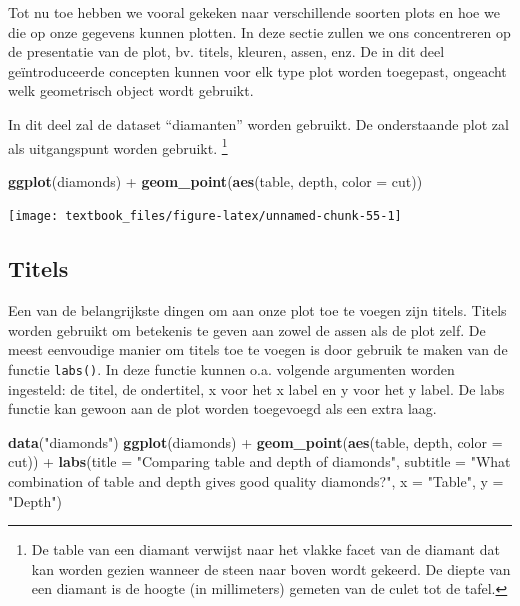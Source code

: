 \documentclass[]{tufte-book}
\newenvironment{Shaded}{}{}
\newcommand{\DataTypeTok}[1]{\textcolor[rgb]{0.56,0.13,0.00}{#1}}
\newcommand{\KeywordTok}[1]{\textcolor[rgb]{0.00,0.44,0.13}{\textbf{#1}}}
\newcommand{\NormalTok}[1]{#1}
\newcommand{\OperatorTok}[1]{\textcolor[rgb]{0.40,0.40,0.40}{#1}}
\newcommand{\StringTok}[1]{\textcolor[rgb]{0.25,0.44,0.63}{#1}}
\begin{document}
Tot nu toe hebben we vooral gekeken naar verschillende soorten plots en hoe we die op onze gegevens kunnen plotten. In deze sectie zullen we ons concentreren op de presentatie van de plot, bv. titels, kleuren, assen, enz. De in dit deel geïntroduceerde concepten kunnen voor elk type plot worden toegepast, ongeacht welk geometrisch object wordt gebruikt.

In dit deel zal de dataset ``diamanten'' worden gebruikt. De onderstaande plot zal als uitgangspunt worden gebruikt. \footnote{De table van een diamant verwijst naar het vlakke facet van de diamant dat kan worden gezien wanneer de steen naar boven wordt gekeerd. De diepte van een diamant is de hoogte (in millimeters) gemeten van de culet tot de tafel.}

\begin{Shaded}
\begin{Highlighting}[]
\KeywordTok{ggplot}\NormalTok{(diamonds) }\OperatorTok{+}
\StringTok{    }\KeywordTok{geom_point}\NormalTok{(}\KeywordTok{aes}\NormalTok{(table, depth, }\DataTypeTok{color =}\NormalTok{ cut))}
\end{Highlighting}
\end{Shaded}

\texttt{[image: textbook\_files/figure-latex/unnamed-chunk-55-1]}

\hypertarget{titels}{%
\subsection{Titels}\label{titels}}

Een van de belangrijkste dingen om aan onze plot toe te voegen zijn titels. Titels worden gebruikt om betekenis te geven aan zowel de assen als de plot zelf. De meest eenvoudige manier om titels toe te voegen is door gebruik te maken van de functie \texttt{labs()}. In deze functie kunnen o.a. volgende argumenten worden ingesteld: de titel, de ondertitel, x voor het x label en y voor het y label. De labs functie kan gewoon aan de plot worden toegevoegd als een extra laag.

\begin{Shaded}
\begin{Highlighting}[]
\KeywordTok{data}\NormalTok{(}\StringTok{"diamonds"}\NormalTok{)}
\KeywordTok{ggplot}\NormalTok{(diamonds) }\OperatorTok{+}
\StringTok{    }\KeywordTok{geom_point}\NormalTok{(}\KeywordTok{aes}\NormalTok{(table, depth, }\DataTypeTok{color =}\NormalTok{ cut)) }\OperatorTok{+}\StringTok{ }
\StringTok{    }\KeywordTok{labs}\NormalTok{(}\DataTypeTok{title =} \StringTok{"Comparing table and depth of diamonds"}\NormalTok{,}
         \DataTypeTok{subtitle =} \StringTok{"What combination of table and depth gives good quality diamonds?"}\NormalTok{,}
         \DataTypeTok{x =} \StringTok{"Table"}\NormalTok{,}
         \DataTypeTok{y =} \StringTok{"Depth"}\NormalTok{)}
\end{Highlighting}
\end{Shaded}
\end{document}
